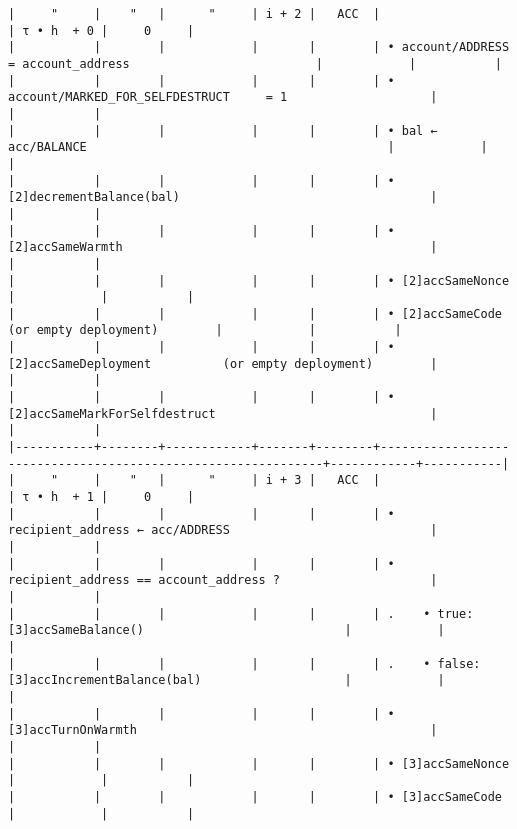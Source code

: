 \documentclass[varwidth=\maxdimen,margin=0.5cm,multi={verbatim}]{standalone}
\begin{document}
\begin{verbatim}
|     "     |    "   |      "     | i + 2 |   ACC  |                                                              | τ • h  + 0 |     0     |
|           |        |            |       |        | • account/ADDRESS = account_address                          |            |           |
|           |        |            |       |        | • account/MARKED_FOR_SELFDESTRUCT     = 1                    |            |           |
|           |        |            |       |        | • bal ← acc/BALANCE                                          |            |           |
|           |        |            |       |        | • [2]decrementBalance(bal)                                   |            |           |
|           |        |            |       |        | • [2]accSameWarmth                                           |            |           |
|           |        |            |       |        | • [2]accSameNonce                                            |            |           |
|           |        |            |       |        | • [2]accSameCode                (or empty deployment)        |            |           |
|           |        |            |       |        | • [2]accSameDeployment          (or empty deployment)        |            |           |
|           |        |            |       |        | • [2]accSameMarkForSelfdestruct                              |            |           |
|-----------+--------+------------+-------+--------+--------------------------------------------------------------+------------+-----------|
|     "     |    "   |      "     | i + 3 |   ACC  |                                                              | τ • h  + 1 |     0     |
|           |        |            |       |        | • recipient_address ← acc/ADDRESS                            |            |           |
|           |        |            |       |        | • recipient_address == account_address ?                     |            |           |
|           |        |            |       |        | .    • true:  [3]accSameBalance()                            |            |           |
|           |        |            |       |        | .    • false: [3]accIncrementBalance(bal)                    |            |           |
|           |        |            |       |        | • [3]accTurnOnWarmth                                         |            |           |
|           |        |            |       |        | • [3]accSameNonce                                            |            |           |
|           |        |            |       |        | • [3]accSameCode                                             |            |           |

\end{verbatim}
\end{document}
